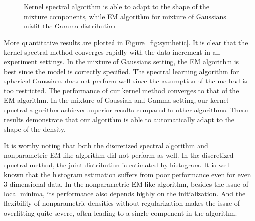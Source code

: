 \documentclass{article}
\begin{document}
\begin{figure}[t]
	\vspace{-3mm}
	\vspace{-4mm}
  \caption{Kernel spectral algorithm is able to adapt to the shape of the mixture components, while EM algorithm for mixture of Gaussians misfit the Gamma distribution.}\label{fig:shape}
	\vspace{-3mm}
\end{figure}

More quantitative results are plotted in Figure~\ref{fig:synthetic}. It is clear that the kernel spectral method converges rapidly with the data increment in all experiment settings. In the mixture of Gaussians setting, the EM algorithm is best since the model is correctly specified. The spectral learning algorithm for spherical Gaussians does not perform well since the assumption of the method is too restricted. The performance of our kernel method converges to that of the EM algorithm. In the mixture of Gaussian and Gamma setting, our kernel spectral algorithm achieves superior results compared to other algorithms. These results demonstrate that our algorithm is able to automatically adapt to the shape of the density.

It is worthy noting that both the discretized spectral algorithm and nonparametric EM-like algorithm did not perform as well. In the discretized spectral method, the joint distribution is estimated by histogram. It is well-known that the histogram estimation suffers from poor performance even for even 3 dimensional data. In the nonparametric EM-like algorithm, besides the issue of local minima, its performance also depends highly on the initialization. And the flexibility of nonparametric densities without regularization makes the issue of overfitting quite severe, often leading to a single component in the algorithm.
\end{document}
